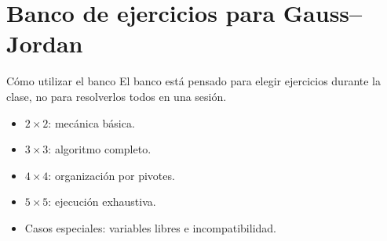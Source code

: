 \documentclass[aspectratio=169,9pt]{beamer}
\theoremstyle{remark}
\begin{document}
\section{Banco de ejercicios para Gauss--Jordan}
\begin{frame}[t]{Cómo utilizar el banco}
El banco está pensado para elegir ejercicios durante la clase, no para resolverlos todos en una sesión.
\begin{itemize}
\item \(2\times2\): mecánica básica.
\item \(3\times3\): algoritmo completo.
\item \(4\times4\): organización por pivotes.
\item \(5\times5\): ejecución exhaustiva.
\item Casos especiales: variables libres e incompatibilidad.
\end{itemize}
\end{frame}
\end{document}
